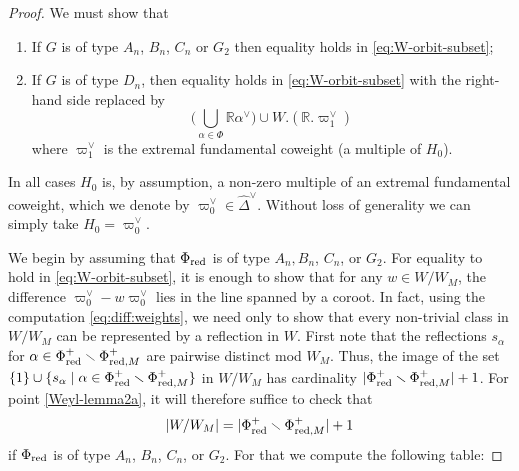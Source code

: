 \documentclass[12pt]{amsart}
\theoremstyle{remark}
\newcommand{\R}{\mathbb R}
\begin{document}
\begin{proof}
We must show that
\begin{enumerate}
\item\label{Weyl-lemma2a} If $G$ is of type $A_n$, $B_n$, $C_n$ or $G_2$ then equality holds in \eqref{eq:W-orbit-subset};
\item\label{Weyl-lemma2b} If $G$ is of type $D_n$, then equality holds in \eqref{eq:W-orbit-subset} with the right-hand side replaced by
\[
\Big(\bigcup_{\alpha\in\Phi}\R\alpha^\vee \big) \cup W.(\R.\varpi^\vee_1)
\]
where $\varpi_1^\vee$ is the extremal fundamental coweight (a multiple of $H_0$).
\end{enumerate}
In all cases $H_0$ is, by assumption, a non-zero multiple of an extremal fundamental coweight, which we denote by $\varpi_0^\vee\in\widehat{\Delta}^\vee$. Without loss of generality we can simply take $H_0 = \varpi_0^\vee$.


We begin by assuming that $\Phi_{\textnormal{red}}$ is of type $A_n, B_n$, $C_n$, or $G_2$. For equality to hold in \eqref{eq:W-orbit-subset}, it is enough to show that for any $w \in W/W_M$, the difference $\varpi_0^\vee - w \varpi_0^\vee$ lies in the line spanned by a coroot. In fact, using the computation \eqref{eq:diff:weights}, we need only to show that every non-trivial class in $W/W_M$ can be represented by a reflection in $W$. First note that the reflections $s_\alpha$  for $\alpha\in \Phi_{\textnormal{red}}^+ \smallsetminus \Phi_{\textnormal{red},M}^+$ are pairwise distinct mod $W_M$. Thus, the image of the set $\{1\}\cup \{s_\alpha \mid  \alpha\in \Phi_{\textnormal{red}}^+ \smallsetminus \Phi_{\textnormal{red},M}^+ \}$ in $W/W_M$ has cardinality $|\Phi_{\textnormal{red}}^+ \smallsetminus \Phi_{\textnormal{red},M}^+| + 1$. For point \eqref{Weyl-lemma2a}, it will therefore suffice to check that
\[
 |W/W_M|
 = |\Phi_{\textnormal{red}}^+ \smallsetminus \Phi_{\textnormal{red},M}^+| + 1
\]
if $\Phi_{\textnormal{red}}$ is of type $A_n$, $B_n$, $C_n$, or $G_2$. For that we compute the following table:



\end{proof}
\end{document}
